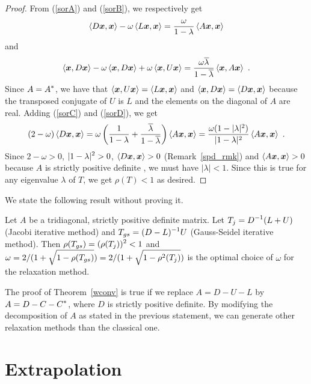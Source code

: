 \begin{proof}
From (\ref{sorA}) and (\ref{sorB}), we respectively get
\begin{equation}\label{sorC}
\left\langle{D\bm{x}} , {\bm{x}}\right\rangle - \omega \left\langle{L\bm{x}} , {\bm{x}}\right\rangle
= \frac{\omega}{1-\lambda} \left\langle{A\bm{x}} , {\bm{x}}\right\rangle
\end{equation}
and
\begin{equation}\label{sorD}
\left\langle{\bm{x}} , {D\bm{x}}\right\rangle - \omega\left\langle{\bm{x}} , {D\bm{x}}\right\rangle
+ \omega \left\langle{\bm{x}} , {U\bm{x}}\right\rangle
= \frac{\omega \overline{\lambda}}{1-\overline{\lambda}}
\left\langle{\bm{x}} , {A\bm{x}}\right\rangle \ .
\end{equation}
Since $\displaystyle A = A^\ast$, we have that
$\left\langle{\bm{x}} , {U\bm{x}}\right\rangle = \left\langle{L\bm{x}} , {\bm{x}}\right\rangle$ and
$\left\langle{\bm{x}} , {D\bm{x}}\right\rangle = \left\langle{D\bm{x}} , {\bm{x}}\right\rangle$ because the
transposed conjugate of $U$ is $L$ and the elements on the diagonal of
$A$ are real.  Adding (\ref{sorC}) and (\ref{sorD}), we get
\[
(2-\omega) \left\langle{D\bm{x}} , {\bm{x}}\right\rangle =
\omega \left( \frac{1}{1-\lambda} +
\frac{\overline{\lambda}}{1-\overline{\lambda}} \right) \left\langle{A\bm{x}} , {\bm{x}}\right\rangle
= \frac{\omega(1-|\lambda|^2)}{|1-\lambda|^2} \left\langle{A\bm{x}} , {\bm{x}}\right\rangle
\ .
\]
Since $2-\omega > 0$, $\displaystyle |1-\lambda|^2>0$,
$\left\langle{D\bm{x}} , {\bm{x}}\right\rangle > 0$ (Remark~\ref{spd_rmk}) and
$\left\langle{A\bm{x}} , {\bm{x}}\right\rangle > 0$ because $A$ is strictly positive definite
, we must have $|\lambda|<1$.  Since this is true for any
eigenvalue $\lambda$ of $T$, we get $\rho(T) < 1$ as desired.
\end{proof}

We state the following result without proving it.

\begin{theorem}
Let $A$ be a tridiagonal, strictly positive definite matrix.  Let
$\displaystyle T_j = D^{-1}(L+U)$ (Jacobi iterative method) and
$\displaystyle T_{gs} = (D-L)^{-1}U$ (Gauss-Seidel iterative method).  Then
$\displaystyle \rho(T_{gs}) = (\rho(T_j))^2 < 1$ and
$\displaystyle \omega = 2/(1+\sqrt{1-\rho(T_{gs})})
= 2/(1+\sqrt{1-\rho^2(T_j)})$
is the optimal choice of $\omega$ for the relaxation method.
\end{theorem}

\begin{rmk}
The proof of Theorem~\ref{wconv} is true if we replace $A=D-U-L$ by
$\displaystyle A=D-C-C^\ast$, where $D$ is strictly positive definite.
By modifying the decomposition of $A$ as stated in the previous
statement, we can generate other relaxation methods than the classical one.
\end{rmk}

\section{Extrapolation}

